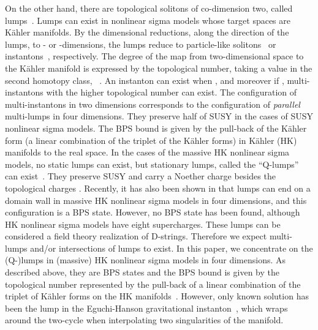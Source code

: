 \documentclass[a4paper,12pt]{article}
\providecommand{\kahler}{K\"{a}hler }
\begin{document}
On the other hand, there are 
topological solitons of co-dimension two, called lumps~\cite{Ward}. 
Lumps can exist in nonlinear sigma models 
whose target spaces are \kahler manifolds. 
By the dimensional reductions, 
along the direction of the lumps,  
to \coordHE{}- or \coordHE{}-dimensions, 
the lumps reduce to particle-like solitons~\cite{Ward} 
or instantons~\cite{BP}, respectively. 
The degree of the map from two-dimensional space to 
the \kahler manifold \coordHE{} is expressed by 
the topological number, taking a value in 
the second homotopy class, \coordHE{}~\cite{BP,Perelomov}. 
An instanton can exist when \coordHE{}, 
and moreover if \coordHE{}, 
multi-instantons with the higher topological number can exist. 
The configuration of multi-instantons in two dimensions 
corresponds to the configuration of 
{\it parallel} multi-lumps in four dimensions. 
They preserve half of SUSY in the cases of 
SUSY nonlinear sigma models.  
The BPS bound is given by 
the pull-back of the \kahler form 
(a linear combination of 
the triplet of the \kahler forms) 
in \kahler (HK) manifolds to the real space.  
In the cases of the massive HK nonlinear sigma models, 
no static lumps can exist, 
but stationary lumps, called the ``Q-lumps'' 
can exist~\cite{Leese,Abraham}. 
They preserve \coordHE{} SUSY and 
carry a Noether charge besides the topological charges \cite{Townsend2}. 
Recently, it has also been shown in \cite{Townsend2} 
that lumps can end on a domain wall in massive HK nonlinear sigma models 
in four dimensions, 
and this configuration is a \coordHE{} BPS state. 
However, no \coordHE{} BPS state has been found, 
although HK nonlinear sigma models have eight supercharges.  
These lumps can be considered a field theory realization of D-strings. 
Therefore we expect multi-lumps and/or intersections of lumps to exist. 
In this paper, we concentrate on the (Q-)lumps 
in (massive) HK nonlinear sigma models in four dimensions. 
As described above, they are \coordHE{} BPS states 
and the BPS bound is given by 
the topological number represented by  
the pull-back of a linear combination of 
the triplet of \kahler forms on the HK manifolds~\cite{Ruback}. 
However, only known solution has been the lump in 
the Eguchi-Hanson gravitational instanton~\cite{EH}, 
which wraps around the two-cycle when interpolating two singularities of 
the manifold.  
\end{document}
